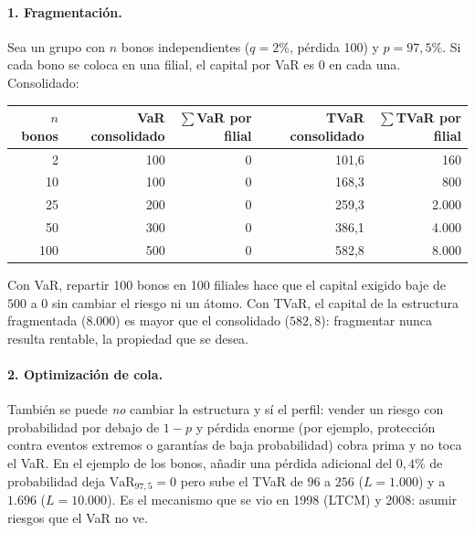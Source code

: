 \documentclass[a4paper,12pt]{article}
\newcommand{\VaR}{\mathrm{VaR}}
\begin{document}
\paragraph{1. Fragmentaci\'on.} Sea un grupo con $n$ bonos independientes ($q=2\%$, p\'erdida 100) y $p=97{,}5\%$. Si cada bono se coloca en una filial, el capital por VaR es $0$ en cada una. Consolidado:
\begin{center}
\small
\begin{tabular}{rrrrr}
\toprule
$n$ bonos & VaR consolidado & $\sum$VaR por filial & TVaR consolidado & $\sum$TVaR por filial\\
\midrule
2 & 100 & 0 & 101,6 & 160\\
10 & 100 & 0 & 168,3 & 800\\
25 & 200 & 0 & 259,3 & 2.000\\
50 & 300 & 0 & 386,1 & 4.000\\
100 & 500 & 0 & 582,8 & 8.000\\
\bottomrule
\end{tabular}
\end{center}
Con VaR, repartir 100 bonos en 100 filiales hace que el capital exigido baje de $500$ a $0$ sin cambiar el riesgo ni un \'atomo. Con TVaR, el capital de la estructura fragmentada ($8.000$) es mayor que el consolidado ($582{,}8$): fragmentar nunca resulta rentable, la propiedad que se desea.

\paragraph{2. Optimizaci\'on de cola.} Tambi\'en se puede \emph{no} cambiar la estructura y s\'i el perfil: vender un riesgo con probabilidad por debajo de $1-p$ y p\'erdida enorme (por ejemplo, protecci\'on contra eventos extremos o garant\'ias de baja probabilidad) cobra prima y no toca el VaR. En el ejemplo de los bonos, a\~nadir una p\'erdida adicional del $0{,}4\%$ de probabilidad deja $\VaR_{97,5}=0$ pero sube el TVaR de $96$ a $256$ ($L=1.000$) y a $1.696$ ($L=10.000$). Es el mecanismo que se vio en 1998 (LTCM) y 2008: asumir riesgos que el VaR no ve.
\end{document}
